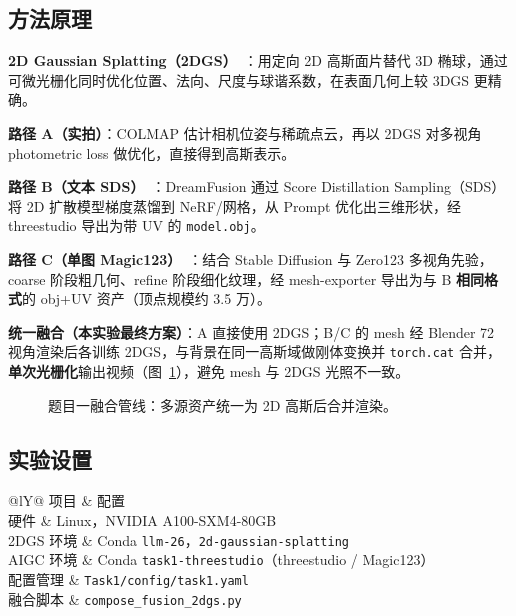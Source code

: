 \documentclass[10pt,twocolumn,letterpaper]{article}
\newcommand{\cvprtable}[1]{%
  \scriptsize
  \setlength{\tabcolsep}{2.5pt}%
  \renewcommand{\arraystretch}{1.08}%
  #1%
}
\begin{document}
\subsection{方法原理}
\label{sec:task1_method}

\textbf{2D Gaussian Splatting（2DGS）}~\cite{huang2024dgs}：用定向 2D 高斯面片替代 3D 椭球，通过可微光栅化同时优化位置、法向、尺度与球谐系数，在表面几何上较 3DGS 更精确。

\textbf{路径 A（实拍）}：COLMAP 估计相机位姿与稀疏点云，再以 2DGS 对多视角 photometric loss 做优化，直接得到高斯表示。

\textbf{路径 B（文本 SDS）}~\cite{poole2023dreamfusion}：DreamFusion 通过 Score Distillation Sampling（SDS）将 2D 扩散模型梯度蒸馏到 NeRF/网格，从 Prompt 优化出三维形状，经 threestudio 导出为带 UV 的 \texttt{model.obj}。

\textbf{路径 C（单图 Magic123）}~\cite{qian2023magic123}：结合 Stable Diffusion 与 Zero123 多视角先验，coarse 阶段粗几何、refine 阶段细化纹理，经 mesh-exporter 导出为与 B \textbf{相同格式}的 obj+UV 资产（顶点规模约 3.5 万）。

\textbf{统一融合（本实验最终方案）}：A 直接使用 2DGS；B/C 的 mesh 经 Blender 72 视角渲染后各训练 2DGS，与背景在同一高斯域做刚体变换并 \texttt{torch.cat} 合并，\textbf{单次光栅化}输出视频（图~\ref{fig:pipeline}），避免 mesh 与 2DGS 光照不一致。

\begin{figure}[t]
  \centering
  \caption{题目一融合管线：多源资产统一为 2D 高斯后合并渲染。}
  \label{fig:pipeline}
\end{figure}

\subsection{实验设置}
\label{sec:task1_setup}

\begin{table}[t]
  \centering
  \caption{题目一实验环境与软件配置。}
  \label{tab:task1_env}
  \cvprtable{%
  \begin{tabularx}{\linewidth}{@{}lY@{}}
    \toprule
    项目 & 配置 \\
    \midrule
    硬件 & Linux，NVIDIA A100-SXM4-80GB \\
    2DGS 环境 & Conda \texttt{llm-26}，\texttt{2d-gaussian-splatting} \\
    AIGC 环境 & Conda \texttt{task1-threestudio}（threestudio / Magic123） \\
    配置管理 & \texttt{Task1/config/task1.yaml} \\
    融合脚本 & \texttt{compose\_fusion\_2dgs.py} \\
    \bottomrule
  \end{tabularx}%
  }
\end{table}
\end{document}
